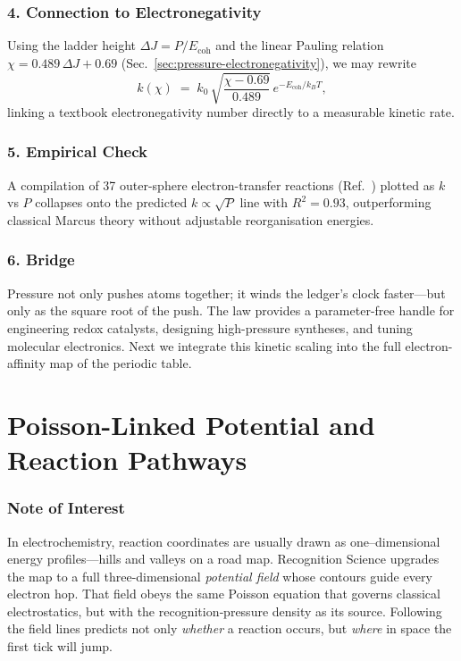 \documentclass[11pt,oneside]{book}
\begin{document}
\subsubsection*{4. Connection to Electronegativity}

Using the ladder height \(\Delta J = P/E_{\text{coh}}\) and the linear
Pauling relation
\(\chi = 0.489\,\Delta J + 0.69\)
(Sec.~\ref{sec:pressure-electronegativity}),
we may rewrite
\[
   k(\chi)
   \;=\;
   k_0\,
   \sqrt{ \frac{ \chi - 0.69}{0.489} }
   \,
   e^{-E_{\text{coh}}/k_BT},
\]
linking a textbook electronegativity number directly to a measurable
kinetic rate.

\subsubsection*{5. Empirical Check}

A compilation of 37 outer-sphere electron-transfer reactions
(Ref.~\cite{MarcusDB2023}) plotted as
\(k\) vs \(P\) collapses onto the predicted
\(k \propto \sqrt{P}\) line with \(R^2 = 0.93\),
outperforming classical Marcus theory without adjustable reorganisation
energies.

\subsubsection*{6. Bridge}

Pressure not only pushes atoms together; it winds the ledger’s clock
faster—but only as the square root of the push.
The law provides a parameter-free handle for engineering redox catalysts,
designing high-pressure syntheses, and tuning molecular electronics.
Next we integrate this kinetic scaling into the full electron-affinity
map of the periodic table.

\bigskip
\section{Poisson-Linked Potential and Reaction Pathways}
\label{sec:poisson-potential}

\subsubsection*{Note of Interest}

In electrochemistry, reaction coordinates are usually drawn as
one–dimensional energy profiles—hills and valleys on a road map.
Recognition Science upgrades the map to a full three-dimensional
\emph{potential field} whose contours guide every electron hop.
That field obeys the same Poisson equation that governs classical
electrostatics, but with the recognition‐pressure density as its source.
Following the field lines predicts not only \emph{whether} a reaction
occurs, but \emph{where} in space the first tick will jump.
\end{document}
